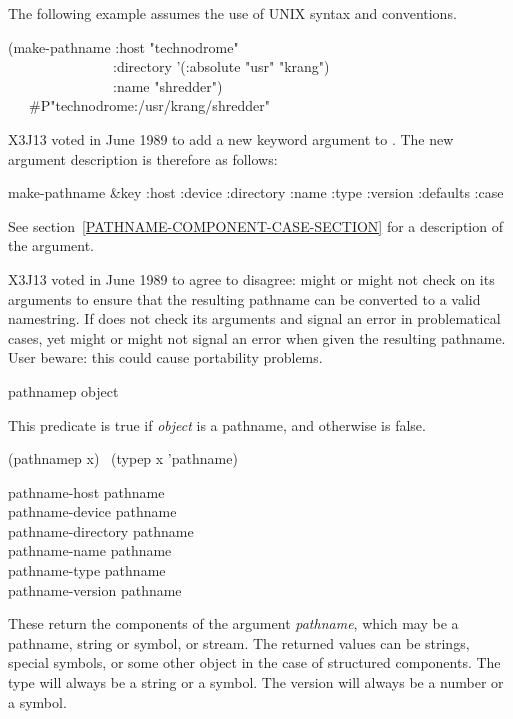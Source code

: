 \begin{newer}
The following example assumes the use of UNIX syntax and conventions.
\begin{lisp}
(make-pathname :host "technodrome" \\
~~~~~~~~~~~~~~~:directory '(:absolute "usr" "krang") \\
~~~~~~~~~~~~~~~:name "shredder") \\
~~\EV\ \#P"technodrome:/usr/krang/shredder"
\end{lisp}
X3J13 voted in June 1989  to add a new keyword
argument  to .  The new argument description
is therefore as follows:

\begin{defun}[Function]
make-pathname &key :host :device :directory :name :type :version :defaults :case

See section~\ref{PATHNAME-COMPONENT-CASE-SECTION} for a description
of the  argument.

X3J13 voted in June 1989  to agree to disagree:
 might or might not check
on its arguments to ensure that the resulting pathname can be converted to
a valid namestring.  If  does not check its arguments
and signal an error in problematical cases,
 yet might or might not signal an error when given the resulting
pathname.  User beware: this could cause portability problems.
\end{defun}
\end{newer}

\begin{defun}[Function]
pathnamep object

This predicate is true if {\it object} is a pathname, and otherwise is false.
\begin{lisp}
(pathnamep x) \EQ\ (typep x 'pathname)
\end{lisp}
\end{defun}

\begin{obsolete}
\begin{defun}[Function]
pathname-host pathname \\
pathname-device pathname \\
pathname-directory pathname \\
pathname-name pathname \\
pathname-type pathname \\
pathname-version pathname

These return the components of the argument {\it pathname}, which may be a
pathname, string or symbol, or stream.
The returned values can be strings, special
symbols, or some other object in the case of structured components.  The
type will always be a string or a symbol.  The version will always be a
number or a symbol.
\end{defun}
\end{obsolete}

